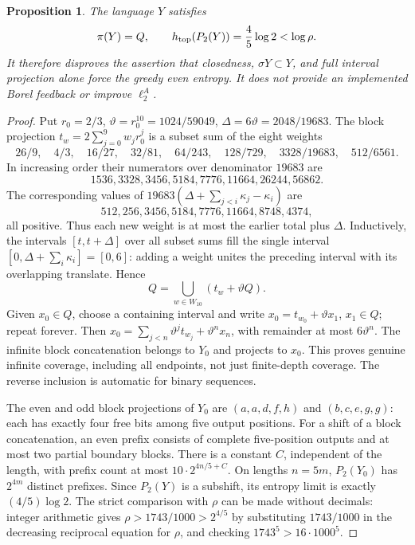 \documentclass[11pt,reqno]{amsart}
\numberwithin{equation}{section}
\newtheorem{proposition}[theorem]{Proposition}
\theoremstyle{definition}
\begin{document}
\begin{proposition}\label{prop:abstract-low}
The language $Y$ satisfies
\[
 \pi(Y)=Q,\qquad
 h_{\rm top}(P_2(Y))=\frac45\log2<\log\rho.
\]
It therefore disproves the assertion that closedness,
$\sigma Y\subset Y$, and full interval projection alone force
the greedy even entropy. It does not provide an implemented
Borel feedback or improve $\ell_2^A$.
\end{proposition}
\begin{proof}
Put $r_0=2/3$, $\vartheta=r_0^{10}=1024/59049$,
$\Delta=6\vartheta=2048/19683$.
The block projection $t_w=2\sum_{j=0}^9w_jr_0^j$ is a
subset sum of the eight weights
\[
 26/9,\quad4/3,\quad16/27,\quad32/81,\quad64/243,
 \quad128/729,\quad3328/19683,\quad512/6561.
\]
In increasing order their numerators over denominator $19683$ are
\[
 1536,3328,3456,5184,7776,11664,26244,56862.
\]
The corresponding values of
$19683(\Delta+\sum_{j<i}\kappa_j-\kappa_i)$ are
\[
 512,256,3456,5184,7776,11664,8748,4374,
\]
all positive.
Thus each new weight is at most the earlier total plus $\Delta$.
Inductively, the intervals $[t,t+\Delta]$ over all subset sums
fill the single interval $[0,\Delta+\sum_i\kappa_i]=[0,6]$:
adding a weight unites the preceding interval with its overlapping
translate. Hence
\[
 Q=\bigcup_{w\in W_{10}}(t_w+\vartheta Q).
\]
Given $x_0\in Q$, choose a containing interval and write
$x_0=t_{w_0}+\vartheta x_1$, $x_1\in Q$; repeat forever.
Then
$x_0=\sum_{j<n}\vartheta^jt_{w_j}+\vartheta^nx_n$,
with remainder at most $6\vartheta^n$. The infinite block
concatenation belongs to $Y_0$ and projects to $x_0$.
This proves genuine infinite coverage, including all endpoints,
not just finite-depth coverage. The reverse inclusion is automatic
for binary sequences.

The even and odd block projections of $Y_0$ are
$(a,a,d,f,h)$ and $(b,c,e,g,g)$: each has exactly four free
bits among five output positions. For a shift of a block
concatenation, an even prefix consists of complete five-position
outputs and at most two partial boundary blocks. There is a
constant $C$, independent of the length, with prefix count at
most $10\cdot2^{4n/5+C}$. On lengths $n=5m$, $P_2(Y_0)$
has $2^{4m}$ distinct prefixes. Since $P_2(Y)$ is a subshift,
its entropy limit is exactly $(4/5)\log2$.
The strict comparison with $\rho$ can be made without decimals:
integer arithmetic gives
$\rho>1743/1000>2^{4/5}$ by substituting $1743/1000$ in
the decreasing reciprocal equation for $\rho$, and checking
$1743^5>16\cdot1000^5$.
\end{proof}
\end{document}
